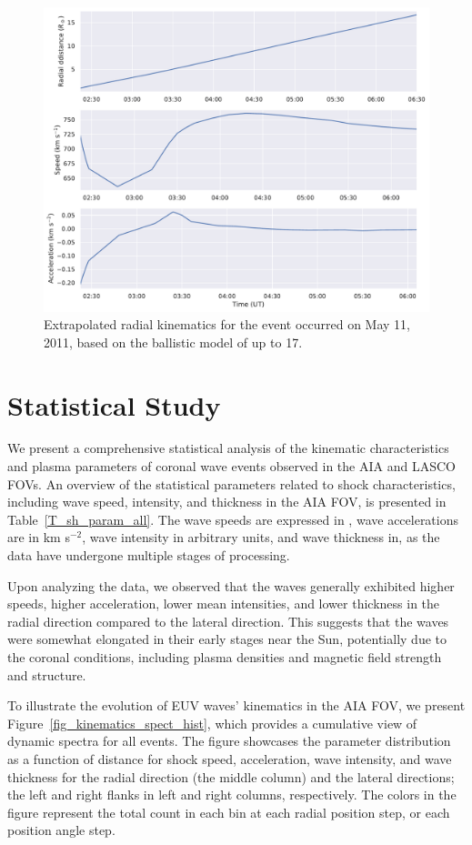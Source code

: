 \begin{figure}[!htp] %
	\centerline{\includegraphics[width=0.8\columnwidth]{chapter2/figs/radial_kinematics_aia_lasco_110511_01.pdf}}
	\caption{Extrapolated radial kinematics for the event occurred on May 11, 2011, based on the ballistic model of \cite{gallagher_2003} up to 17\rsun.}
	\label{fig_rad_kinematics_aialasco_110511}
\end{figure}

\section{Statistical Study}
We present a comprehensive statistical analysis of the kinematic characteristics and plasma parameters of coronal wave events observed in the AIA and LASCO FOVs.
An overview of the statistical parameters related to shock characteristics, including wave speed, intensity, and thickness in the AIA FOV, is presented in Table~\ref{T_sh_param_all}. The wave speeds are expressed in \kms, wave accelerations are in km s$^{-2}$, wave intensity in arbitrary units, and wave thickness in\rsun, as the data have undergone multiple stages of processing.

Upon analyzing the data, we observed that the waves generally exhibited higher speeds, higher acceleration, lower mean intensities, and lower thickness in the radial direction compared to the lateral direction. This suggests that the waves were somewhat elongated in their early stages near the Sun, potentially due to the coronal conditions, including plasma densities and magnetic field strength and structure.

To illustrate the evolution of EUV waves' kinematics in the AIA FOV, we present Figure~\ref{fig_kinematics_spect_hist}, which provides a cumulative view of dynamic spectra for all events. The figure showcases the parameter distribution as a function of distance for shock speed, acceleration, wave intensity, and wave thickness for the radial direction (the middle column) and the lateral directions; the left and right flanks in left and right columns, respectively. The colors in the figure represent the total count in each bin at each radial position step, or each position angle step.

